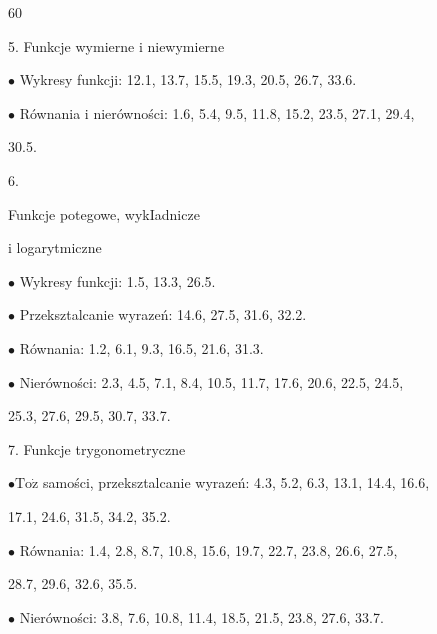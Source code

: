 \documentclass[a4paper,12pt]{article}
\begin{document}
60

5. Funkcje wymierne i niewymierne

$\bullet$ Wykresy funkcji: 12.1, 13.7, 15.5, 19.3, 20.5, 26.7, 33.6.

$\bullet$ Równania $\mathrm{i}$ nierówności: 1.6, 5.4, 9.5, 11.8, 15.2, 23.5, 27.1, 29.4,

30.5.

6.

Funkcje potegowe, wykIadnicze

i logarytmiczne

$\bullet$ Wykresy funkcji: 1.5, 13.3, 26.5.

$\bullet$ Przeksztalcanie wyrazeń: 14.6, 27.5, 31.6, 32.2.

$\bullet$ Równania: 1.2, 6.1, 9.3, 16.5, 21.6, 31.3.

$\bullet$ Nierówności: 2.3, 4.5, 7.1, 8.4, 10.5, 11.7, 17.6, 20.6, 22.5, 24.5,

25.3, 27.6, 29.5, 30.7, 33.7.

7. Funkcje trygonometryczne

$\bullet \mathrm{T}\mathrm{o}\dot{\mathrm{z}}$ samości, przeksztalcanie wyrazeń: 4.3, 5.2, 6.3, 13.1, 14.4, 16.6,

17.1, 24.6, 31.5, 34.2, 35.2.

$\bullet$ Równania: 1.4, 2.8, 8.7, 10.8, 15.6, 19.7, 22.7, 23.8, 26.6, 27.5,

28.7, 29.6, 32.6, 35.5.

$\bullet$ Nierówności: 3.8, 7.6, 10.8, 11.4, 18.5, 21.5, 23.8, 27.6, 33.7.
\end{document}
